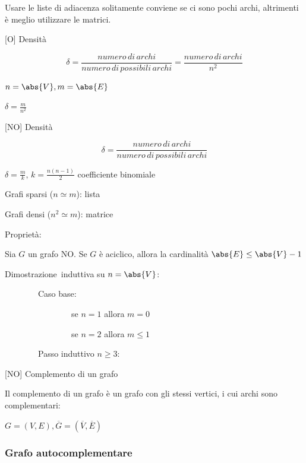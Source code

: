 \documentclass{article}
\begin{document}
{{}

{}

{Usare le liste di adiacenza solitamente conviene se ci sono pochi
archi, altrimenti è meglio utilizzare le matrici.}

{}

{{[}O{]} Densità}

\begin{equation}
\delta=\frac{numero\,di\,archi}{numero\,di\,possibili\,archi} = \frac{numero\,di\,archi}{n^2}
\end{equation}

$n=\abs{V},m=\abs{E}$

$\delta=\frac{m}{n^2}$

{{[}NO{]} Densità}

\begin{equation}
\delta=\frac{numero\,di\,archi}{numero\,di\,possibili\,archi}
\end{equation}

{$\delta=\frac{m}{k},\,k = \frac{n(n-1)}{2}$ coefficiente binomiale}

{}

{Grafi sparsi ($n\simeq m$): lista}

{Grafi densi ($n^2\simeq m$): matrice}

{}

{Proprietà:}

{Sia $G$ un grafo NO. Se $G$ è aciclico, allora la cardinalità $\abs{E} \leq \abs{V}-1$}

{Dimostrazione}{~induttiva su $n=\abs{V}$:}

{~~~~~~~~Caso base:}

{~~~~~~~~~~~~~~~~se $n=1$ allora $m = 0$

{~~~~~~~~~~~~~~~~se $n=2$ allora $m \leq 1$

{~~~~~~~~Passo induttivo $n \geq 3$:}



{{[}NO{]} Complemento di un grafo}

{Il complemento di un grafo è un grafo con gli stessi vertici, i cui
archi sono complementari:}

$G=(V,E), \overline{G}=(\overline{V},\overline{E})$

{}

\hypertarget{h.tsrwv4qy0dku}{\subsubsection{\texorpdfstring{{Grafo
autocomplementare}}{Grafo autocomplementare}}\label{h.tsrwv4qy0dku}}

}}}
\end{document}
